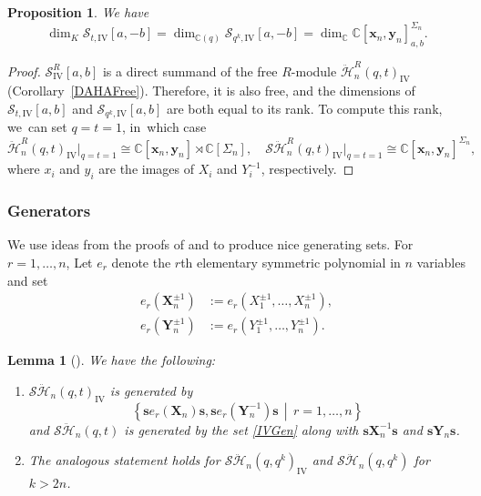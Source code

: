 \documentclass[JEP,XML,SOM,Unicode,published]{cedram}
\newtheorem{prop}[thm]{Proposition}
\newtheorem{lem}[thm]{Lemma}
\theoremstyle{definition}
\newcommand{\CC}{\mathbb{C}}
\newcommand{\SHH}{\mathcal{S}\ddot{\mathcal{H}}}
\newcommand{\HH}{\ddot{\mathcal{H}}}
\newcommand{\ee}{\boldsymbol{s}}
\begin{document}
\begin{prop}\label{IVRank}
We have
\[
\dim_{K}\mathcal{S}_{t,\mathrm{IV}}[a,-b]=\dim_{\CC(q)}\mathcal{S}_{q^k,\mathrm{IV}}[a,-b]=\dim_\CC \CC[\boldsymbol{x}_n,\boldsymbol{y}_n]^{\Sigma_n}_{a,b}.
\]
\end{prop}

\begin{proof}
$\mathcal{S}^R_{\mathrm{IV}}[a,b]$ is a direct summand of the free $R$-module $\HH_n^R(q,t)_{\mathrm{IV}}$ (Corollary~\ref{DAHAFree}).
Therefore, it is also free, and the dimensions of $\mathcal{S}_{t,\mathrm{IV}}[a,b]$ and $\mathcal{S}_{q^k,\mathrm{IV}}[a,b]$ are both equal to its rank.
To compute this rank, we~can set $q=t=1$, in~which case
\[
\HH_n^R(q,t)_{\mathrm{IV}}\big|_{q=t=1}\cong \CC[\boldsymbol{x}_n, \boldsymbol{y}_n]\rtimes\CC[\Sigma_n],\quad
\SHH_n^R(q,t)_{\mathrm{IV}}\big|_{q=t=1}\cong \CC[\boldsymbol{x}_n, \boldsymbol{y}_n]^{\Sigma_n},
\]
where $x_i$ and $y_i$ are the images of $X_i$ and $Y_i^{-1}$, respectively.
\end{proof}

\subsubsection{Generators}\label{Gen}
We use ideas from the proofs of \cite[Prop.\,2.5]{SchiffVassMac} and \cite[Lem.\,5.2]{FFJMM} to produce nice generating sets.
For $r=1,\ldots, n$, Let $e_r$ denote the $r$th elementary symmetric polynomial in $n$ variables and set
\begin{equation}
\begin{aligned}
e_r(\boldsymbol{X}_n^{\pm 1})&:=e_r(X_1^{\pm 1},\ldots, X_n^{\pm 1}),\\
e_r(\boldsymbol{Y}_n^{\pm 1})&:=e_r(Y_1^{\pm 1},\ldots, Y_n^{\pm 1}).
\end{aligned}
\label{ElemXY}
\end{equation}
\begin{lem}[{\cite[Lem.\,A.15.2]{VarVassRoot}}]\label{GenLem}
We have the following:
\begin{enumerate}
\item\label{GenLem1} $\SHH_n(q,t)_{\mathrm{IV}}$ is generated by
\begin{equation}
\left\{ \boldsymbol{s} e_r(\boldsymbol{X}_n)\boldsymbol{s},\boldsymbol{s} e_r(\boldsymbol{Y}_n^{-1})\boldsymbol{s}\, \middle|\, r=1,\ldots, n \right\}
\label{IVGen}
\end{equation}
and $\SHH_n(q,t)$ is generated by the set \eqref{IVGen} along with $\ee \boldsymbol{X}_n^{-1}\ee$ and $\ee \boldsymbol{Y}_n\ee$.
\item\label{GenLem2} The analogous statement holds for $\SHH_n(q,q^k)_{\mathrm{IV}}$ and $\SHH_n(q,q^k)$ for $k>2n$.
\end{enumerate}
\end{lem}
\end{document}
